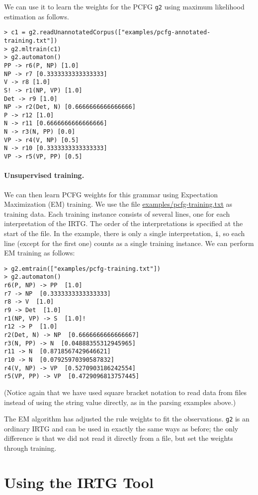 \documentclass[11pt]{article}
\begin{document}
We can use it to learn the weights for the PCFG \verb?g2? using
maximum likelihood estimation as follows.

\begin{verbatim}
> c1 = g2.readUnannotatedCorpus(["examples/pcfg-annotated-training.txt"])
> g2.mltrain(c1)
> g2.automaton()
PP -> r6(P, NP) [1.0]
NP -> r7 [0.3333333333333333]
V -> r8 [1.0]
S! -> r1(NP, VP) [1.0]
Det -> r9 [1.0]
NP -> r2(Det, N) [0.6666666666666666]
P -> r12 [1.0]
N -> r11 [0.6666666666666666]
N -> r3(N, PP) [0.0]
VP -> r4(V, NP) [0.5]
N -> r10 [0.3333333333333333]
VP -> r5(VP, PP) [0.5]
\end{verbatim}

\paragraph{Unsupervised training.}



We can then learn PCFG weights for this grammar using Expectation
Maximization (EM) training. We use the file
\url{examples/pcfg-training.txt} as training data. Each training
instance consists of several lines, one for each interpretation of the
IRTG. The order of the interpretations is specified at the start of
the file. In the example, there is only a single interpretation,
\verb?i?, so each line (except for the first one) counts as a single
training instance. We can perform EM training as follows:

\begin{verbatim}
> g2.emtrain(["examples/pcfg-training.txt"])
> g2.automaton()
r6(P, NP) -> PP  [1.0]
r7 -> NP  [0.3333333333333333]
r8 -> V  [1.0]
r9 -> Det  [1.0]
r1(NP, VP) -> S  [1.0]!
r12 -> P  [1.0]
r2(Det, N) -> NP  [0.6666666666666667]
r3(N, PP) -> N  [0.04888355312945965]
r11 -> N  [0.8718567429646621]
r10 -> N  [0.07925970390587832]
r4(V, NP) -> VP  [0.5270903186242554]
r5(VP, PP) -> VP  [0.4729096813757445]
\end{verbatim}

(Notice again that we have used square bracket notation to read data
from files instead of using the string value directly, as in the
parsing examples above.)

The EM algorithm has adjusted the rule weights to fit the
observations. \verb?g2? is an ordinary IRTG and can be used in exactly
the same ways as before; the only difference is that we did not read
it directly from a file, but set the weights through training.


\section{Using the IRTG Tool} \label{sec:using}
\end{document}
